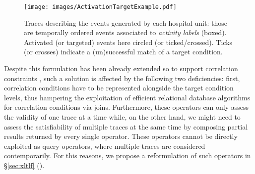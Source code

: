 \begin{figure}[!t]
	\centering

\texttt{[image: images/ActivationTargetExample.pdf]}
	\caption{Traces describing the events generated by each hospital unit: those are temporally ordered events associated to \textit{activity labels} (boxed). Activated  (or targeted) events here circled (or ticked/crossed). Ticks (or crosses) indicate a (un)successful match of a target condition.}
	\label{fig:comparison}
\end{figure}
Despite this formulation has been already extended so to support correlation constraints \cite{BurattinMS16}, such a solution is affected by the following two deficiencies: first, correlation conditions have to be represented alongside the target condition levels, thus hampering the exploitation of efficient relational database algorithms for correlation conditions via joins. Furthermore, these operators can only assess the validity of one trace at a time while, on the other hand, we might need to assess the satisfiability of multiple traces at the same time by composing partial results returned by every single operator. These operators cannot be directly exploited as query operators, where multiple traces are considered contemporarily. %
For this reasons, we propose a reformulation of such operators in \S\ref{sec:xltlf} (\xLTLf). 
